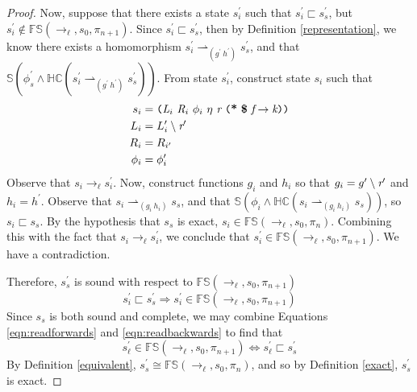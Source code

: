 \begin{proof}

Now, suppose that there exists a state $s_i^\prime$ such that $s_i^\prime \sqsubset s_s^\prime$, but $s_i^\prime \notin \mathbb{FS}(\rightarrow_{\ell},s_0,\pi_{n+1})$. Since $s_i^\prime \sqsubset s_s^\prime$, then by Definition \ref{representation}, we know there exists a homomorphism $s_i^\prime \rightharpoonup_{(g^\prime\ h^\prime)} s_s^\prime$, and that $\mathbb{S}( \phi_s^\prime \wedge \mathbb{HC}(s_i^\prime \rightharpoonup_{(g^\prime\ h^\prime)} s_s^\prime) )$. From state $s_i^\prime$, construct state $s_i$ such that 
\begin{align*}
s_i &= \lp \cfgnt{L}_{i}\ \cfgnt{R}_{i}\ \phi_i\ \eta\ \cfgnt{r}\ \lp \cfgt{*}\ \cfgt{\$}\ \cfgnt{f} \rightarrow \cfgnt{k}\rp \rp\\
L_i &= L_i^\prime \setminus \cfgnt{r}^\prime \\
R_i &= R_{i^\prime}\\
\phi_i &= \phi_i^\prime
\end{align*}
Observe that $s_i \rightarrow_\ell s_i^\prime$. Now, construct functions $g_i$ and $h_i$ so that $g_i = g^\prime \setminus \emph{r}^\prime$ and $h_i = h^\prime$. Observe that $s_i \rightharpoonup_{(g_i\ h_i)} s_s$, and that $\mathbb{S}( \phi_i \wedge \mathbb{HC}(s_i \rightharpoonup_{(g_i\ h_i)} s_s) )$, so $s_i \sqsubset s_s$. By the hypothesis that $s_s$ is exact, $s_i \in\mathbb{FS}(\rightarrow_{\ell},s_0,\pi_n)$. Combining this with the fact that $s_i \rightarrow_\ell s_i^\prime$, we conclude that $s_i^\prime \in \mathbb{FS}(\rightarrow_{\ell},s_0,\pi_{n+1})$. We have a contradiction.

 Therefore, $s_s^\prime$ is sound with respect to $\mathbb{FS}(\rightarrow_{\ell},s_0,\pi_{n+1})$
 \begin{equation}
 \label{eqn:readbackwards}
 s_i^\prime \sqsubset s_s^\prime \Rightarrow s_i^\prime \in \mathbb{FS}(\rightarrow_{\ell},s_0,\pi_{n+1})
 \end{equation}
Since $s_s$ is both sound and complete, we may combine Equations \ref{eqn:readforwards} and \ref{eqn:readbackwards} to find that 
$$s_\ell^\prime \in \mathbb{FS}(\rightarrow_{\ell},s_0,\pi_{n+1}) \Leftrightarrow s_\ell^\prime \sqsubset s_s^\prime$$
By Definition \ref{equivalent}, $s_s^\prime \cong \mathbb{FS}(\rightarrow_{\ell},s_0,\pi_n)$, and so by Definition \ref{exact}, $s_s^\prime$ is exact.


\end{proof}
